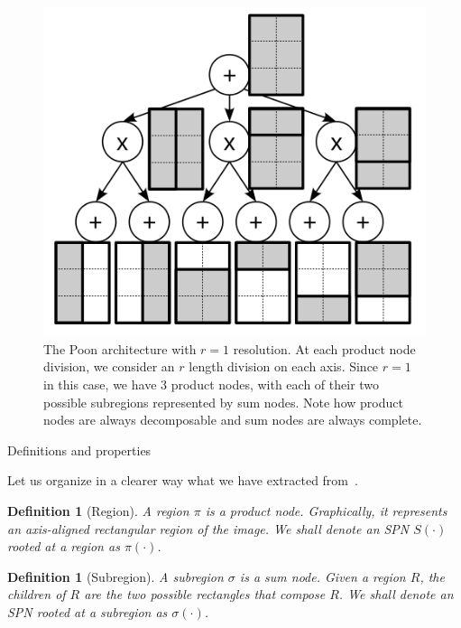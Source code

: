 \documentclass{amsart}
\makeatletter
\def\subsection{\@startsection{subsection}{3}%
  \z@{.5\linespacing\@plus.7\linespacing}{.1\linespacing}%
  {\normalfont}}
\theoremstyle{plain}
\newcounter{dummy-def}\numberwithin{dummy-def}{section}
\newtheorem{definition}[dummy-def]{Definition}
\newcounter{dummy-thm}\numberwithin{dummy-thm}{section}
\newcounter{dummy-prop}\numberwithin{dummy-prop}{section}
\newcounter{dummy-corollary}\numberwithin{dummy-corollary}{section}
\newcounter{dummy-lemma}\numberwithin{dummy-lemma}{section}
\newcounter{dummy-ex}\numberwithin{dummy-ex}{section}
\newcounter{dummy-eg}\numberwithin{dummy-eg}{section}
\numberwithin{equation}{section}
\makeatother
\begin{document}
\begin{figure}[h]
  \centering
  \includegraphics[scale=1.0]{imgs/dv_spn.png}
  \captionsetup{justification=raggedright}
  \caption{The Poon architecture with $r = 1$ resolution. At each product node division, we
  consider an $r$ length division on each axis. Since $r=1$ in this case, we have $3$ product
  nodes, with each of their two possible subregions represented by sum nodes. Note how product
  nodes are always decomposable and sum nodes are always complete.\label{fig:dv_spn}}
\end{figure}

\subsection{Definitions and properties}

Let us organize in a clearer way what we have extracted from~\cite{clustering}.

\begin{definition}[Region] A region $\pi$ is a product node. Graphically, it represents an
  axis-aligned rectangular region of the image. We shall denote an SPN $S(\cdot)$ rooted at a
  region as $\pi(\cdot)$.
\end{definition}

\begin{definition}[Subregion] A subregion $\sigma$ is a sum node. Given a region $R$, the children
  of $R$ are the two possible rectangles that compose $R$. We shall denote an SPN rooted at a
  subregion as $\sigma(\cdot)$.
\end{definition}
\end{document}
